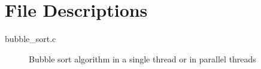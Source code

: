 \documentclass[letterpaper]{article}
\begin{document}
\section{File Descriptions}
\begin{description}
    \item[bubble\_sort.c] Bubble sort algorithm in a single thread or
        in parallel threads
\end{description}
\end{document}
